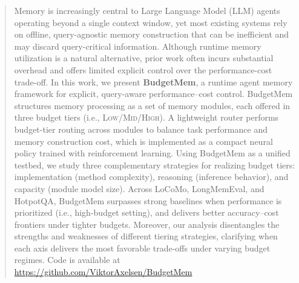 \documentclass{article}
\theoremstyle{plain}
\theoremstyle{definition}
\theoremstyle{remark}
\begin{document}


\begin{abstract}


Memory is increasingly central to Large Language Model (LLM) agents operating beyond a single context window, yet most existing systems rely on offline, query-agnostic memory construction that can be inefficient and may discard query-critical information. Although runtime memory utilization is a natural alternative, prior work often incurs substantial overhead and offers limited explicit control over the performance-cost trade-off.  
In this work, we present \textbf{BudgetMem}, a runtime agent memory framework for explicit, query-aware performance–cost control. 
BudgetMem structures memory processing as a set of memory modules, each offered in three budget tiers (i.e., \textsc{Low}/\textsc{Mid}/\textsc{High}). A lightweight router performs budget-tier routing across modules to balance task performance and memory construction cost, which is implemented as a compact neural policy trained with reinforcement learning.
Using BudgetMem as a unified testbed, we study three complementary strategies for realizing budget tiers: implementation (method complexity), reasoning (inference behavior), and capacity (module model size). 
Across LoCoMo, LongMemEval, and HotpotQA, BudgetMem surpasses strong baselines when performance is prioritized (i.e., high-budget setting), and delivers better accuracy–cost frontiers under tighter budgets. 
Moreover, our analysis disentangles the strengths and weaknesses of different tiering strategies, clarifying when each axis delivers the most favorable trade-offs under varying budget regimes.
Code is available at \href{https://github.com/ViktorAxelsen/BudgetMem}{https://github.com/ViktorAxelsen/BudgetMem}




\end{abstract}
\end{document}
